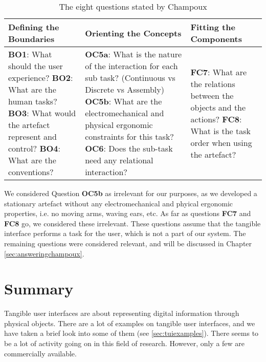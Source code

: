 \begin{table}[h]
\centering
	\begin{tabular}{| p{4.0cm} | p{4.0cm} | p{4.0cm} |}
	\hline
	\textbf{Defining the Boundaries} & \textbf{Orienting the Concepts} & \textbf{Fitting the Components} \\
	\hline
	\textbf{BO1}: What should the user experience? \newline
	\textbf{BO2}: What are the human tasks? \newline
	\textbf{BO3}: What would the artefact represent and control? \newline 
	\textbf{BO4}: What are the conventions? \newline 
	&
	\textbf{OC5a}: What is the nature of the interaction for each sub task? (Continuous vs Discrete vs Assembly) \newline
	\textbf{OC5b}: What are the electromechanical and physical ergonomic constraints for this task? \newline
	\textbf{OC6}: Does the sub-task need any relational interaction? \newline
	&
	\textbf{FC7}: What are the relations between the objects and the actions? \newline 
	\textbf{FC8}: What is the task order when using the artefact? \\ 
	\hline
	
	\end{tabular}
	\caption{The eight questions stated by Champoux\cite{champoux2007design}}
	\label{tab:tuidesign}
\end{table}  

We considered Question \textbf{OC5b} as irrelevant for our purposes, as we developed a stationary artefact without any electromechanical and phyical ergonomic properties, i.e. no moving arms, waving ears, etc. As far as questions \textbf{FC7} and \textbf{FC8} go, we considered these irrelevant. These questions assume that the tangible interface performs a task for the user, which is not a part of our system. The remaining questions were considered relevant, and will be discussed in Chapter \ref{sec:answeringchampoux}.     



\section{Summary}
\label{sec:tangiblesummary}
Tangible user interfaces are about representing digital information through physical objects. There are a lot of examples on tangible user interfaces, and we have taken a brief look into some of them (see \ref{sec:tuiexamples}). There seems to be a lot of activity going on in this field of research. However, only a few are commercially available. 

